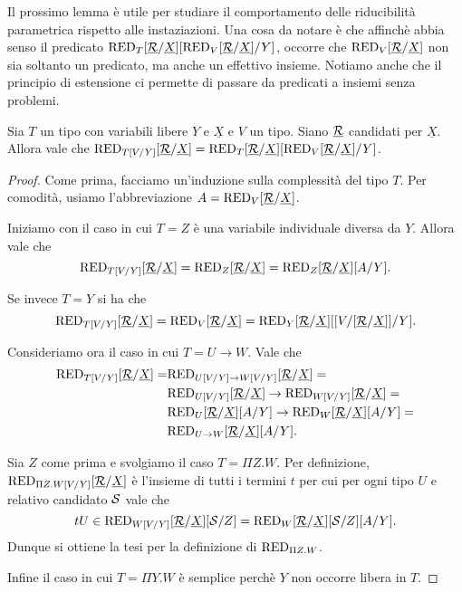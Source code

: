 \documentclass[]{marticle}
\begin{document}
Il prossimo lemma \`e utile per studiare il comportamento delle riducibilit\`a
parametrica rispetto alle instaziazioni. Una cosa da notare \`e che affinch\`e
abbia senso il predicato $\text{RED}_{T}[\underline{\mathcal{R}}/\underline{X}] [\text{RED}_{V}[\underline{\mathcal{R}}/\underline{X}]/Y]$, occorre che
$\text{RED}_{V}[\underline{\mathcal{R}}/\underline{X}]$ non sia soltanto un predicato, ma anche un effettivo insieme.
Notiamo anche che il principio di estensione ci permette di passare da predicati
a insiemi senza problemi.
\begin{block} [Lemmma]
    Sia $T$ un tipo con variabili libere $Y$ e $\underline{X}$ e $V$ un tipo.
    Siano $\underline{\mathcal{R}}$ candidati per $\underline{X}$. Allora vale che
    $\text{RED}_{T[V/Y]}[\underline{\mathcal{R}}/\underline{X}]= \text{RED}_{T}[\underline{\mathcal{R}}/\underline{X}] [\text{RED}_{V}[\underline{\mathcal{R}}/\underline{X}]/Y]$.
\end{block}
\begin{proof}
    Come prima, facciamo un'induzione sulla complessit\`a del tipo $T$. Per
    comodit\`a, usiamo l'abbreviazione $A=\text{RED}_{V}[\underline{\mathcal{R}}/\underline{X}]$.

    Iniziamo con il caso in cui $T=Z$ \`e una variabile individuale diversa da
    $Y$. Allora vale che 
    \[
        \text{RED}_{T[V/Y]}[\underline{\mathcal{R}}/\underline{X}] = \text{RED}_{Z}[\underline{\mathcal{R}}/\underline{X}] = \text{RED}_{Z}[\underline{\mathcal{R}}/\underline{X}][A/Y].
    \]

    Se invece $T=Y$ si ha che
    \[
        \text{RED}_{T[V/Y]}[\underline{\mathcal{R}}/\underline{X}] = \text{RED}_{V}[\underline{\mathcal{R}}/\underline{X}] = \text{RED}_{Y}[\underline{\mathcal{R}}/\underline{X}][
            [V/[\underline{\mathcal{R}}/\underline{X}]]/Y].
    \]

    Consideriamo ora il caso in cui $T=U\rightarrow W$. Vale che
    \begin{align*}
        \text{RED}_{T[V/Y]}[\underline{\mathcal{R}}/\underline{X}] = 
        &\text{RED}_{U[V/Y]\rightarrow W[V/Y]}[\underline{\mathcal{R}}/\underline{X}] =  \\
        &\text{RED}_{U[V/Y]}[\underline{\mathcal{R}}/\underline{X}] \rightarrow \text{RED}_{W[V/Y]}[\underline{\mathcal{R}}/\underline{X}]= \\
        &\text{RED}_{U}[\underline{\mathcal{R}}/\underline{X}][A/Y] \rightarrow\text{RED}_{W}[\underline{\mathcal{R}}/\underline{X}][A/Y] = \\
        &\text{RED}_{U\rightarrow W}[\underline{\mathcal{R}}/\underline{X}][A/Y].
    \end{align*}

    Sia $Z$ come prima e svolgiamo il caso $T=\Pi Z. W$. Per definizione,
    $\text{RED}_{\Pi Z. W[V/Y]}[\underline{\mathcal{R}}/\underline{X}]$ \`e l'insieme di tutti i termini $t$ per
    cui per ogni tipo $U$ e relativo candidato $\mathcal{S}$ vale che
    \[
        tU\in \text{RED}_{W[V/Y]}[\underline{\mathcal{R}}/\underline{X}][\mathcal{S}/Z] = 
        \text{RED}_{W}[\underline{\mathcal{R}}/\underline{X}][\mathcal{S}/Z][A/Y].
    \]
    Dunque si ottiene la tesi per la definizione di $\text{RED}_{\Pi Z.W}$.

    Infine il caso in cui $T=\Pi Y.W$ \`e semplice perch\`e $Y$ non occorre
    libera in $T$.
\end{proof}
\end{document}
